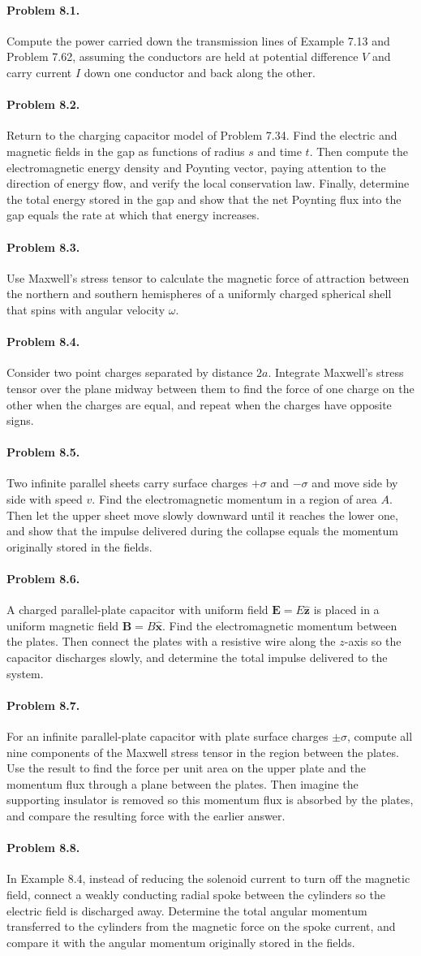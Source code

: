 \documentclass{aa}
\newcommand{\problemstatement}[2]{%
\paragraph{Problem #1.}#2\par\medskip
}
\begin{document}
\problemstatement{8.1}{Compute the power carried down the transmission lines of Example 7.13 and Problem 7.62, assuming the conductors are held at potential difference \(V\) and carry current \(I\) down one conductor and back along the other.}
\problemstatement{8.2}{Return to the charging capacitor model of Problem 7.34. Find the electric and magnetic fields in the gap as functions of radius \(s\) and time \(t\). Then compute the electromagnetic energy density and Poynting vector, paying attention to the direction of energy flow, and verify the local conservation law. Finally, determine the total energy stored in the gap and show that the net Poynting flux into the gap equals the rate at which that energy increases.}
\problemstatement{8.3}{Use Maxwell's stress tensor to calculate the magnetic force of attraction between the northern and southern hemispheres of a uniformly charged spherical shell that spins with angular velocity \(\omega\).}
\problemstatement{8.4}{Consider two point charges separated by distance \(2a\). Integrate Maxwell's stress tensor over the plane midway between them to find the force of one charge on the other when the charges are equal, and repeat when the charges have opposite signs.}
\problemstatement{8.5}{Two infinite parallel sheets carry surface charges \(+\sigma\) and \(-\sigma\) and move side by side with speed \(v\). Find the electromagnetic momentum in a region of area \(A\). Then let the upper sheet move slowly downward until it reaches the lower one, and show that the impulse delivered during the collapse equals the momentum originally stored in the fields.}
\problemstatement{8.6}{A charged parallel-plate capacitor with uniform field \( \mathbf E=E\hat{\mathbf z}\) is placed in a uniform magnetic field \( \mathbf B=B\hat{\mathbf x}\). Find the electromagnetic momentum between the plates. Then connect the plates with a resistive wire along the \(z\)-axis so the capacitor discharges slowly, and determine the total impulse delivered to the system.}
\problemstatement{8.7}{For an infinite parallel-plate capacitor with plate surface charges \(\pm\sigma\), compute all nine components of the Maxwell stress tensor in the region between the plates. Use the result to find the force per unit area on the upper plate and the momentum flux through a plane between the plates. Then imagine the supporting insulator is removed so this momentum flux is absorbed by the plates, and compare the resulting force with the earlier answer.}
\problemstatement{8.8}{In Example 8.4, instead of reducing the solenoid current to turn off the magnetic field, connect a weakly conducting radial spoke between the cylinders so the electric field is discharged away. Determine the total angular momentum transferred to the cylinders from the magnetic force on the spoke current, and compare it with the angular momentum originally stored in the fields.}
\end{document}
